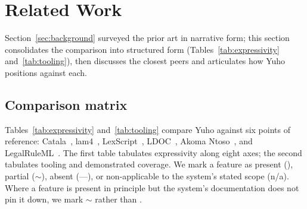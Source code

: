 \section{Related Work}
\label{sec:related}

Section~\ref{sec:background} surveyed the prior art in narrative form;
this section consolidates the comparison into structured form
(Tables~\ref{tab:expressivity} and~\ref{tab:tooling}), then discusses
the closest peers and articulates how Yuho positions against each.

\subsection{Comparison matrix}
\label{subsec:matrix}

Tables~\ref{tab:expressivity} and~\ref{tab:tooling} compare Yuho against
six points of reference: Catala~\cite{catala2021},
lam4~\cite{lam4}, LexScript~\cite{lexscript},
LDOC~\cite{ldoc}, Akoma Ntoso~\cite{akomantoso}, and
LegalRuleML~\cite{legalruleml}. The first table tabulates expressivity
along eight axes; the second tabulates tooling and demonstrated
coverage. We mark a feature as present (\checkmark), partial
($\sim$), absent (---), or non-applicable to the system's stated
scope (n/a). Where a feature is present in principle but the system's
documentation does not pin it down, we mark $\sim$ rather than
\checkmark.

